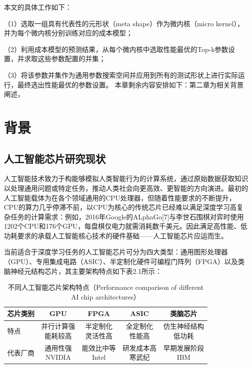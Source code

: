 \documentclass[a4paper, nosysfonts]{hpcchina}
\begin{document}
    本文的具体工作如下：

（1）选取一组具有代表性的元形状（meta shape）作为微内核（micro kernel），并为每个微内核分别训练对应的成本模型；

（2）利用成本模型的预测结果，从每个微内核中选取性能最优的Top-k参数设置，并求取这些参数配置的并集；

（3）将该参数并集作为通用参数搜索空间并应用到所有的测试形状上进行实际运行，最终选出性能最优的参数设置。
本章剩余内容安排如下：第二章为相关背景阐述，
    \section{背景}
    
    \subsection{人工智能芯片研究现状}
    人工智能技术致力于构能够模拟人类智能行为的计算系统，通过原始数据获取知识以处理通用问题或特定任务，推动人类社会向更高效、更智能的方向演进。最初的人工智能载体为在各个领域通用的CPU处理器，但随着性能要求的不断提升，CPU的算力几乎停滞不前，以CPU为核心的传统芯片已经难以满足深度学习高复杂任务的计算需求：例如，2016年Google的ALphaGo[7]与李世石围棋对弈时使用1202个CPU和176个GPU，每盘棋仅电力就需消耗数千美元。因此满足高性能、低功耗要求的承载人工智能核心技术的硬件基础——人工智能芯片应运而生。


    当前适合于深度学习任务的人工智能芯片可分为四大类型：通用图形处理器（GPU）、专用集成电路（ASIC）、半定制化硬件可编程门阵列（FPGA）以及类脑神经元结构芯片，其主要架构特点如下表2.1所示： 
\vspace{-1.8em}
    \begin{table}[H] 
  \centering
  \caption{不同人工智能芯片架构特点（Performance comparison of different AI chip architectures）}
  \begin{tabular}{lcccc}
    \toprule
    芯片类别 & GPU & FPGA & ASIC & 类脑芯片 \\
    \midrule
    特点 & \makecell{并行计算强\\能耗较高} 
        & \makecell{半定制化\\灵活性高} 
        & \makecell{全定制化\\性能高} 
        & \makecell{仿生神经结构\\低功耗} \\
    代表厂商 & \makecell{通用性强\\NVIDIA} 
            & \makecell{能效比中等\\Intel} 
            & \makecell{研发成本高\\寒武纪} 
            & \makecell{早期发展阶段\\IBM} \\
    \bottomrule
  \end{tabular}
\end{table}
\end{document}

